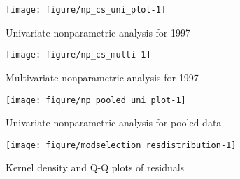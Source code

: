 \documentclass[12pt,a4paper]{article}\usepackage[]{graphicx}\usepackage[]{color}
\newenvironment{knitrout}{}{} %
\begin{document}
\begin{knitrout}
\color{fgcolor}\begin{figure}[htbp]

{\centering \texttt{[image: figure/np\_cs\_uni\_plot-1]} 

}

\caption[Univariate nonparametric analysis for 1997]{Univariate nonparametric analysis for 1997}\label{fig:np.cs.uni.plot}
\end{figure}


\end{knitrout}
\begin{knitrout}
\color{fgcolor}\begin{figure}[htbp]

{\centering \texttt{[image: figure/np\_cs\_multi-1]} 

}

\caption[Multivariate nonparametric analysis for 1997]{Multivariate nonparametric analysis for 1997}\label{fig:np.cs.multi}
\end{figure}


\end{knitrout}
\begin{knitrout}
\color{fgcolor}\begin{figure}[htbp]

{\centering \texttt{[image: figure/np\_pooled\_uni\_plot-1]} 

}

\caption[Univariate nonparametric analysis for pooled data]{Univariate nonparametric analysis for pooled data}\label{fig:np.pooled.uni.plot}
\end{figure}


\end{knitrout}
\begin{knitrout}
\color{fgcolor}\begin{figure}[htbp]

{\centering \texttt{[image: figure/modselection\_resdistribution-1]} 

}

\caption[Kernel density and Q-Q plots of residuals]{Kernel density and Q-Q plots of residuals}\label{fig:modselection_resdistribution}
\end{figure}


\end{knitrout}
\end{document}
